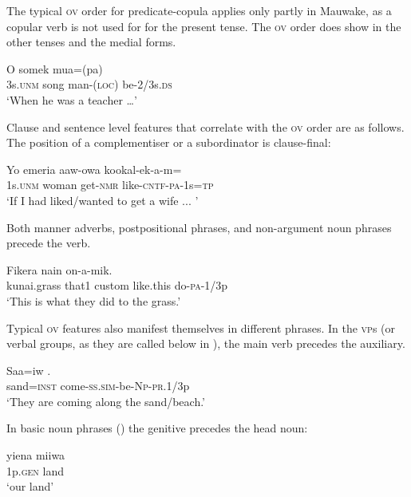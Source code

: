 The typical \textsc{ov} order for predicate-copula applies only partly in Mauwake, as a copular verb is not used for for the present tense. The \textsc{ov} order does show in the other tenses and the medial forms.

\ea%
\label{ex:1:x676}
\gll O  somek  mua=(pa)   \\
3s.\textsc{unm}  song  man-(\textsc{loc})  be-2/3s.\textsc{ds}      \\
\glt`When he was a teacher {\dots}'
\z


Clause and sentence level features that correlate with the \textsc{ov} order are as follows. The position of a complementiser or a subordinator is clause-final:

\ea%
\label{ex:1:x677}
\gll Yo  emeria  aaw-owa  kookal-ek-a-m= \\
 1s.\textsc{unm}  woman  get-\textsc{nmr}  like-\textsc{cntf}-\textsc{pa}-1s=\textsc{tp} \\
\glt`If I had liked/wanted to get a wife ...  '
\z


Both manner adverbs, postpositional phrases, and non-argument noun phrases precede the verb.

\ea%
\label{ex:1:x678}
\gll Fikera  nain     on-a-mik. \\
  kunai.grass  that1  custom  like.this  do-\textsc{pa}-1/3p    \\
\glt `This is what they did to the  grass.'
\z


Typical \textsc{ov} features also manifest themselves in different phrases. In the \textsc{vp}s (or verbal groups, as they are called below in ), the main verb precedes the auxiliary.

\ea%
\label{ex:1:x679}
\gll Saa=iw . \\
 sand=\textsc{inst}  come-\textsc{ss}.\textsc{sim}-be-\textsc{Np}-\textsc{pr}.1/3p     \\
\glt`They are coming along the sand/beach.'
\z


In basic noun phrases () the genitive precedes the head noun:

\ea%
\label{ex:1:x680}
\gll yiena  miiwa \\
 1p.\textsc{gen}  land     \\
\glt`our land'
\z


